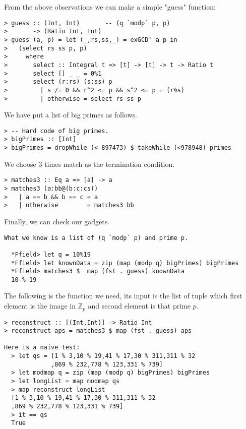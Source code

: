 \documentclass[11pt]{book}
\begin{document}
From the above observations we can make a simple "guess" function:
\begin{verbatim}
> guess :: (Int, Int)       -- (q `modp` p, p)
>       -> (Ratio Int, Int)
> guess (a, p) = let (_,rs,ss,_) = exGCD' a p in
>   (select rs ss p, p)
>     where
>       select :: Integral t => [t] -> [t] -> t -> Ratio t
>       select [] _ _ = 0%1
>       select (r:rs) (s:ss) p
>         | s /= 0 && r^2 <= p && s^2 <= p = (r%s)
>         | otherwise = select rs ss p
\end{verbatim}
We have put a list of big primes as follows.
\begin{verbatim}
> -- Hard code of big primes.
> bigPrimes :: [Int]
> bigPrimes = dropWhile (< 897473) $ takeWhile (<978948) primes  
\end{verbatim}
We choose 3 times match as the termination condition.
\begin{verbatim}
> matches3 :: Eq a => [a] -> a
> matches3 (a:bb@(b:c:cs))
>   | a == b && b == c = a
>   | otherwise        = matches3 bb
\end{verbatim}
Finally, we can check our gadgets.
\begin{verbatim}
What we know is a list of (q `modp` p) and prime p.

  *Ffield> let q = 10%19
  *Ffield> let knownData = zip (map (modp q) bigPrimes) bigPrimes  
  *Ffield> matches3 $  map (fst . guess) knownData 
  10 % 19
\end{verbatim}
The following is the function we need, its input is the list of tuple which first element is the image in $\mathbb{Z}_p$ and second element is that prime $p$.
\begin{verbatim}
> reconstruct :: [(Int,Int)] -> Ratio Int
> reconstruct aps = matches3 $ map (fst . guess) aps

Here is a naive test:
  > let qs = [1 % 3,10 % 19,41 % 17,30 % 311,311 % 32
             ,869 % 232,778 % 123,331 % 739]
  > let modmap q = zip (map (modp q) bigPrimes) bigPrimes 
  > let longList = map modmap qs
  > map reconstruct longList 
  [1 % 3,10 % 19,41 % 17,30 % 311,311 % 32
  ,869 % 232,778 % 123,331 % 739]
  > it == qs
  True
\end{verbatim}
\end{document}
